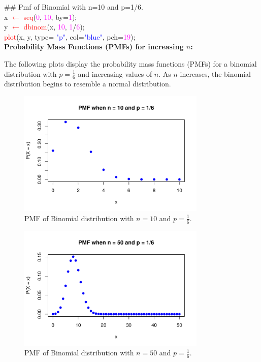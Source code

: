 {\ttfamily
\textcolor{violet!70!black}{\#\# Pmf of Binomial with n=10 and p=1/6.} \\

x \textcolor{red}{$\leftarrow$} \textcolor{red}{seq}(\textcolor{magenta}{0}, \textcolor{magenta}{10}, \textcolor{green!50!black}{by}=\textcolor{magenta}{1}); \\
y \textcolor{red}{$\leftarrow$} \textcolor{red}{dbinom}(x, \textcolor{magenta}{10}, \textcolor{magenta}{1}\textcolor{black}{/}\textcolor{magenta}{6}); \\

\textcolor{red}{plot}(x, y, \textcolor{green!50!black}{type}= \textcolor{blue}{"p"}, \textcolor{green!50!black}{col}=\textcolor{blue}{"blue"}, \textcolor{green!50!black}{pch}=\textcolor{magenta}{19});
}\\


\textbf{Probability Mass Functions (PMFs) for increasing \(n\):}

\vspace{0.5em}

The following plots display the probability mass functions (PMFs) for a binomial distribution with \( p = \frac{1}{6} \) and increasing values of \( n \). As \( n \) increases, the binomial distribution begins to resemble a normal distribution.


\begin{figure}[h!]
  \centering
 \includegraphics[width=0.8\textwidth]{Section4/pmf_plot.pdf}
 \caption{PMF of Binomial distribution with \(n = 10\) and \(p = \frac{1}{6}\).}
\end{figure}

\begin{figure}[h!]
  \centering
  \includegraphics[width=0.8\textwidth]{Section4/pmf_n50.pdf}
  \caption{PMF of Binomial distribution with \(n = 50\) and \(p = \frac{1}{6}\).}
\end{figure}

